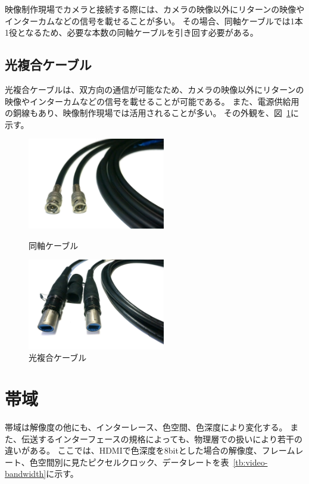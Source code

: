 映像制作現場でカメラと接続する際には、カメラの映像以外にリターンの映像やインターカムなどの信号を載せることが多い。
その場合、同軸ケーブルでは1本1役となるため、必要な本数の同軸ケーブルを引き回す必要がある。

\subsection{光複合ケーブル}
光複合ケーブルは、双方向の通信が可能なため、カメラの映像以外にリターンの映像やインターカムなどの信号を載せることが可能である。
また、電源供給用の銅線もあり、映像制作現場では活用されることが多い。
その外観を、図~\ref{fig:cable-fiber}に示す。

\begin{figure}[htbp]
  \begin{minipage}{0.5\hsize}
    \begin{center}
      \includegraphics[bb=0 0 1200 797,width=6cm]{img/cable-sdi.jpg}
    \end{center}
    \caption{同軸ケーブル}
    \label{fig:cable-sdi}
  \end{minipage}
  \begin{minipage}{0.5\hsize}
    \begin{center}
      \includegraphics[bb=0 0 1200 797,width=6cm]{img/cable-fiber.jpg}
    \end{center}
    \caption{光複合ケーブル}
    \label{fig:cable-fiber}
  \end{minipage}
\end{figure}

\section{帯域}
\label{sec:bandwidth}
帯域は解像度の他にも、インターレース、色空間、色深度により変化する。
また、伝送するインターフェースの規格によっても、物理層での扱いにより若干の違いがある。
ここでは、HDMIで色深度を8bitとした場合の解像度、フレームレート、色空間別に見たピクセルクロック、データレートを表~\ref{tb:video-bandwidth}に示す。

